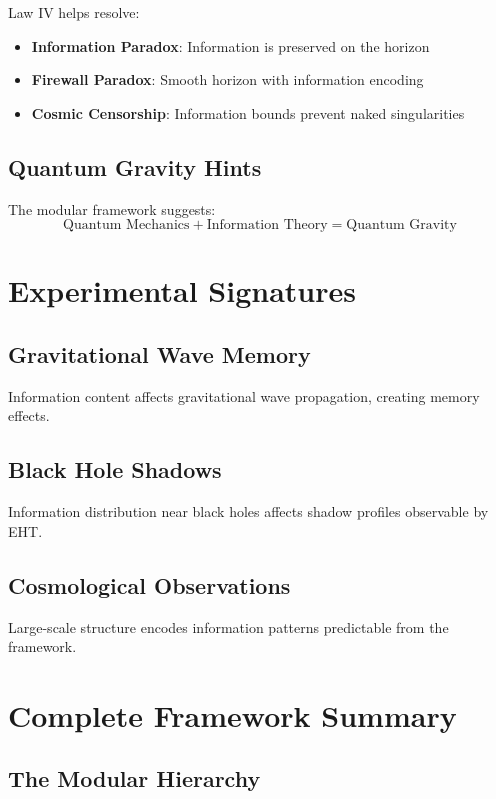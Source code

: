 \documentclass[11pt,a4paper]{article}
\theoremstyle{definition}
\begin{document}
Law IV helps resolve:
\begin{itemize}
\item \textbf{Information Paradox}: Information is preserved on the horizon
\item \textbf{Firewall Paradox}: Smooth horizon with information encoding
\item \textbf{Cosmic Censorship}: Information bounds prevent naked singularities
\end{itemize}

\subsection{Quantum Gravity Hints}

The modular framework suggests:
\begin{equation}
\text{Quantum Mechanics} + \text{Information Theory} = \text{Quantum Gravity}
\end{equation}

\section{Experimental Signatures}

\subsection{Gravitational Wave Memory}
Information content affects gravitational wave propagation, creating memory effects.

\subsection{Black Hole Shadows}
Information distribution near black holes affects shadow profiles observable by EHT.

\subsection{Cosmological Observations}
Large-scale structure encodes information patterns predictable from the framework.

\section{Complete Framework Summary}

\subsection{The Modular Hierarchy}
\end{document}
